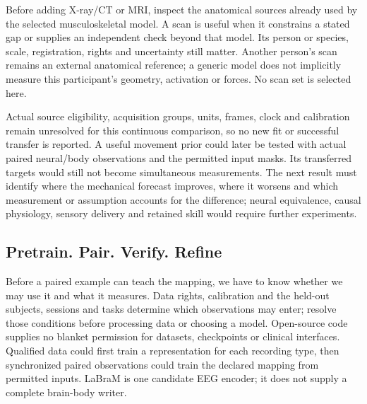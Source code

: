 Before adding X-ray/CT or MRI, inspect the anatomical sources already used by the selected musculoskeletal model. A scan is useful when it constrains a stated gap or supplies an independent check beyond that model. Its person or species, scale, registration, rights and uncertainty still matter. Another person's scan remains an external anatomical reference; a generic model does not implicitly measure this participant's geometry, activation or forces. No scan set is selected here.

Actual source eligibility, acquisition groups, units, frames, clock and calibration remain unresolved for this continuous comparison, so no new fit or successful transfer is reported. A useful movement prior could later be tested with actual paired neural/body observations and the permitted input masks. Its transferred targets would still not become simultaneous measurements. The next result must identify where the mechanical forecast improves, where it worsens and which measurement or assumption accounts for the difference; neural equivalence, causal physiology, sensory delivery and retained skill would require further experiments.

\subsection{Pretrain. Pair. Verify. Refine}
Before a paired example can teach the mapping, we have to know whether we may use it and what it measures. Data rights, calibration and the held-out subjects, sessions and tasks determine which observations may enter; resolve those conditions before processing data or choosing a model. Open-source code supplies no blanket permission for datasets, checkpoints or clinical interfaces. Qualified data could first train a representation for each recording type, then synchronized paired observations could train the declared mapping from permitted inputs. LaBraM is one candidate EEG encoder; it does not supply a complete brain-body writer.

